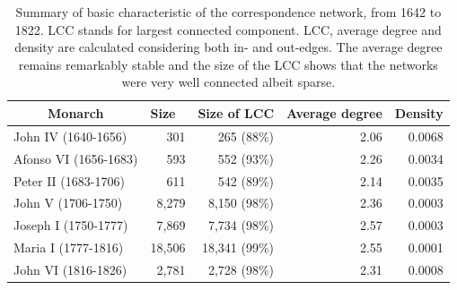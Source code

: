 \documentclass{article}
\begin{document}
\begin{table}[]
	\vspace{0.2cm}
	\centering
	\caption{Summary of basic characteristic of the correspondence network, from 1642 to 1822. LCC stands for largest connected component. LCC, average degree and density are calculated considering both in- and out-edges. The average degree remains remarkably stable and the size of the LCC shows that the networks were very well connected albeit sparse. \label{tb:netsummary}}
	\vspace{0.2cm}
	\begin{tabular}{|l|r|r|r|r|}
		\hline
		\multicolumn{1}{|c|}{Monarch} & \multicolumn{1}{l|}{Size} & \multicolumn{1}{c|}{Size of LCC} & \multicolumn{1}{l|}{Average degree} & \multicolumn{1}{l|}{Density} \\ \hline
		John IV (1640-1656)           & 301                       & 265 (88\%)                       & 2.06                                & 0.0068                       \\ \hline
		Afonso VI (1656-1683)         & 593                       & 552 (93\%)                       & 2.26                                & 0.0034                       \\ \hline
		Peter II (1683-1706)          & 611                       & 542 (89\%)                       & 2.14                                & 0.0035                       \\ \hline
		John V (1706-1750)            & 8,279                     & 8,150 (98\%)                     & 2.36                                & 0.0003                       \\ \hline
		Joseph I (1750-1777)          & 7,869                     & 7,734 (98\%)                     & 2.57                                & 0.0003                       \\ \hline
		Maria I (1777-1816)           & 18,506                    & 18,341 (99\%)                    & 2.55                                & 0.0001                       \\ \hline
		John VI (1816-1826)           & 2,781                     & 2,728 (98\%)                     & 2.31                                & 0.0008                       \\ \hline
	\end{tabular}
\end{table}
\end{document}
